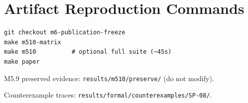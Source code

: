 \section{Artifact Reproduction Commands}
\label{app:repro}

\begin{verbatim}
git checkout m6-publication-freeze
make m510-matrix
make m510          # optional full suite (~45s)
make paper
\end{verbatim}

M5.9 preserved evidence: \texttt{results/m510/preserve/} (do not modify).

Counterexample traces: \texttt{results/formal/counterexamples/SP-08/}.
